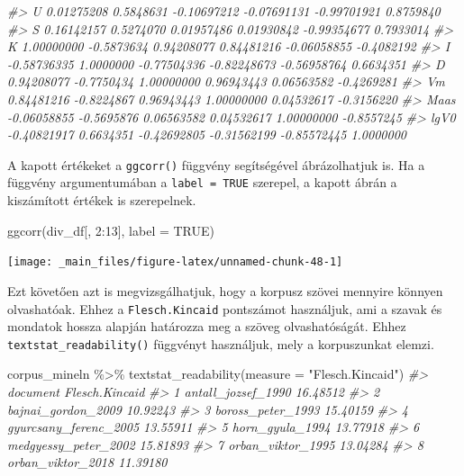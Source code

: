 \documentclass[
]{book}
\newenvironment{Shaded}{\begin{snugshade}}{\end{snugshade}}
\newcommand{\AttributeTok}[1]{\textcolor[rgb]{0.77,0.63,0.00}{#1}}
\newcommand{\CommentTok}[1]{\textcolor[rgb]{0.56,0.35,0.01}{\textit{#1}}}
\newcommand{\ConstantTok}[1]{\textcolor[rgb]{0.00,0.00,0.00}{#1}}
\newcommand{\DecValTok}[1]{\textcolor[rgb]{0.00,0.00,0.81}{#1}}
\newcommand{\FunctionTok}[1]{\textcolor[rgb]{0.00,0.00,0.00}{#1}}
\newcommand{\NormalTok}[1]{#1}
\newcommand{\SpecialCharTok}[1]{\textcolor[rgb]{0.00,0.00,0.00}{#1}}
\newcommand{\StringTok}[1]{\textcolor[rgb]{0.31,0.60,0.02}{#1}}
\begin{document}
\begin{Shaded}
\begin{Highlighting}[]
\CommentTok{\#\textgreater{} U     0.01275208  0.5848631 {-}0.10697212 {-}0.07691131 {-}0.99701921  0.8759840}
\CommentTok{\#\textgreater{} S     0.16142157  0.5274070  0.01957486  0.01930842 {-}0.99354677  0.7933014}
\CommentTok{\#\textgreater{} K     1.00000000 {-}0.5873634  0.94208077  0.84481216 {-}0.06058855 {-}0.4082192}
\CommentTok{\#\textgreater{} I    {-}0.58736335  1.0000000 {-}0.77504336 {-}0.82248673 {-}0.56958764  0.6634351}
\CommentTok{\#\textgreater{} D     0.94208077 {-}0.7750434  1.00000000  0.96943443  0.06563582 {-}0.4269281}
\CommentTok{\#\textgreater{} Vm    0.84481216 {-}0.8224867  0.96943443  1.00000000  0.04532617 {-}0.3156220}
\CommentTok{\#\textgreater{} Maas {-}0.06058855 {-}0.5695876  0.06563582  0.04532617  1.00000000 {-}0.8557245}
\CommentTok{\#\textgreater{} lgV0 {-}0.40821917  0.6634351 {-}0.42692805 {-}0.31562199 {-}0.85572445  1.0000000}
\end{Highlighting}
\end{Shaded}

A kapott értékeket a \texttt{ggcorr()} függvény segítségével
ábrázolhatjuk is. Ha a függvény argumentumában a \texttt{label\ =\ TRUE}
szerepel, a kapott ábrán a kiszámított értékek is szerepelnek.

\begin{Shaded}
\begin{Highlighting}[]
\FunctionTok{ggcorr}\NormalTok{(div\_df[, }\DecValTok{2}\SpecialCharTok{:}\DecValTok{13}\NormalTok{], }\AttributeTok{label =} \ConstantTok{TRUE}\NormalTok{)}
\end{Highlighting}
\end{Shaded}

\begin{center}\texttt{[image: \_main\_files/figure-latex/unnamed-chunk-48-1]} \end{center}

Ezt követően azt is megvizsgálhatjuk, hogy a korpusz szövei mennyire
könnyen olvashatóak. Ehhez a \texttt{Flesch.Kincaid} pontszámot
használjuk, ami a szavak és mondatok hossza alapján határozza meg a
szöveg olvashatóságát. Ehhez \texttt{textstat\_readability()} függvényt
használjuk, mely a korpuszunkat elemzi.

\begin{Shaded}
\begin{Highlighting}[]
\NormalTok{corpus\_mineln }\SpecialCharTok{\%\textgreater{}\%}
  \FunctionTok{textstat\_readability}\NormalTok{(}\AttributeTok{measure =} \StringTok{"Flesch.Kincaid"}\NormalTok{)}
\CommentTok{\#\textgreater{}                document Flesch.Kincaid}
\CommentTok{\#\textgreater{} 1    antall\_jozsef\_1990       16.48512}
\CommentTok{\#\textgreater{} 2    bajnai\_gordon\_2009       10.92243}
\CommentTok{\#\textgreater{} 3     boross\_peter\_1993       15.40159}
\CommentTok{\#\textgreater{} 4 gyurcsany\_ferenc\_2005       13.55911}
\CommentTok{\#\textgreater{} 5       horn\_gyula\_1994       13.77918}
\CommentTok{\#\textgreater{} 6  medgyessy\_peter\_2002       15.81893}
\CommentTok{\#\textgreater{} 7     orban\_viktor\_1995       13.04284}
\CommentTok{\#\textgreater{} 8     orban\_viktor\_2018       11.39180}
\end{Highlighting}
\end{Shaded}
\end{document}
